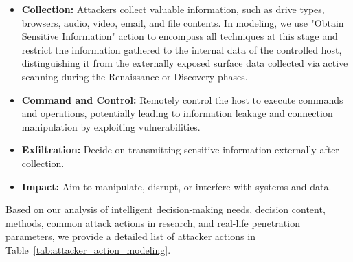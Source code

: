 \begin{itemize}
    \item \textbf{Collection:} Attackers collect valuable information, such as drive types, browsers, audio, video, email, and file contents. In modeling, we use "Obtain Sensitive Information" action to encompass all techniques at this stage and restrict the information gathered to the internal data of the controlled host, distinguishing it from the externally exposed surface data collected via active scanning during the Renaissance or Discovery phases.
    \item \textbf{Command and Control:} Remotely control the host to execute commands and operations, potentially leading to information leakage and connection manipulation by exploiting vulnerabilities.
    \item \textbf{Exfiltration:} Decide on transmitting sensitive information externally after collection.
    \item \textbf{Impact:} Aim to manipulate, disrupt, or interfere with systems and data.
\end{itemize}



Based on our analysis of intelligent decision-making needs, decision content, methods, common attack actions in research, and real-life penetration parameters, we provide a detailed list of attacker actions in Table~\ref{tab:attacker_action_modeling}.


% 


